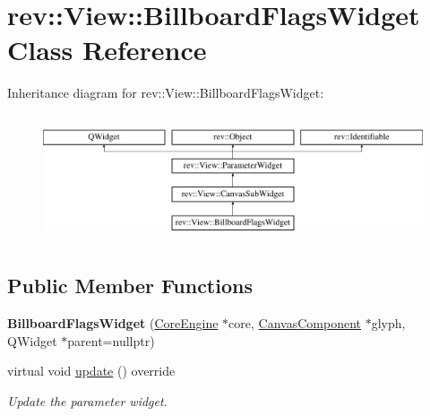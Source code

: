 \hypertarget{classrev_1_1_view_1_1_billboard_flags_widget}{}\section{rev\+::View\+::Billboard\+Flags\+Widget Class Reference}
\label{classrev_1_1_view_1_1_billboard_flags_widget}
Inheritance diagram for rev\+::View\+::Billboard\+Flags\+Widget\+:\begin{figure}[H]
\begin{center}
\leavevmode
\includegraphics[height=3.771044cm]{classrev_1_1_view_1_1_billboard_flags_widget}
\end{center}
\end{figure}
\subsection*{Public Member Functions}
\begin{DoxyCompactItemize}
\item 
\mbox{\label{classrev_1_1_view_1_1_billboard_flags_widget_a3f7327838d725663c457c4c4f2dc99ff}} 
{\bfseries Billboard\+Flags\+Widget} (\mbox{\hyperlink{classrev_1_1_core_engine}{Core\+Engine}} $\ast$core, \mbox{\hyperlink{classrev_1_1_canvas_component}{Canvas\+Component}} $\ast$glyph, Q\+Widget $\ast$parent=nullptr)
\item 
\mbox{\label{classrev_1_1_view_1_1_billboard_flags_widget_a178a9ef2492cb4aab10fc39f9a7430de}} 
virtual void \mbox{\hyperlink{classrev_1_1_view_1_1_billboard_flags_widget_a178a9ef2492cb4aab10fc39f9a7430de}{update}} () override
\begin{DoxyCompactList}\small\item\em Update the parameter widget. \end{DoxyCompactList}\end{DoxyCompactItemize}

